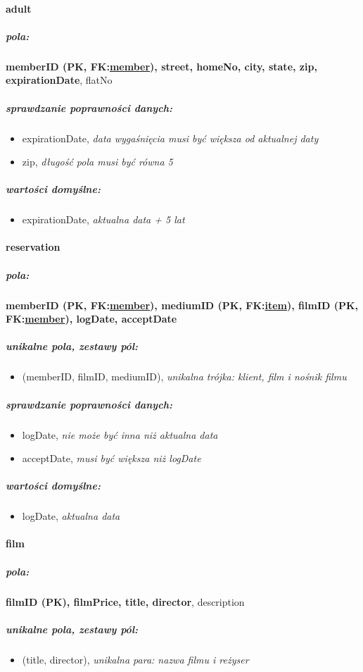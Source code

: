 \documentclass[12pt,a4paper,titlepage]{article}
\begin{document}
\paragraph{adult}
\subparagraph{pola:}
\textbf{memberID (PK, FK:\underline{member}), street, homeNo, city, state, zip, expirationDate}, flatNo
\subparagraph{sprawdzanie poprawności danych:}
\begin{itemize}
	\item expirationDate, \textit{data wygaśnięcia musi być większa od aktualnej daty}
	\item zip, \textit{długość pola musi być równa 5}
\end{itemize}
\subparagraph{wartości domyślne:}
\begin{itemize}
	\item expirationDate, \textit{aktualna data + 5 lat}
\end{itemize}

\paragraph{reservation}
\subparagraph{pola:}
\textbf{memberID (PK, FK:\underline{member}), mediumID (PK, FK:\underline{item}), filmID (PK, FK:\underline{member}), logDate, acceptDate}
\subparagraph{unikalne pola, zestawy pól:}
\begin{itemize}
	\item (memberID, filmID, mediumID), \textit{unikalna trójka: klient, film i nośnik filmu}
\end{itemize}
\subparagraph{sprawdzanie poprawności danych:}
\begin{itemize}
	\item logDate, \textit{nie może być inna niż aktualna data}
	\item acceptDate, \textit{musi być większa niż logDate}
\end{itemize}
\subparagraph{wartości domyślne:}
\begin{itemize}
	\item logDate, \textit{aktualna data}
\end{itemize}

\paragraph{film}
\subparagraph{pola:}
\textbf{filmID (PK), filmPrice, title, director}, description
\subparagraph{unikalne pola, zestawy pól:}
\begin{itemize}
	\item (title, director), \textit{unikalna para: nazwa filmu i reżyser}
\end{itemize}
\end{document}
